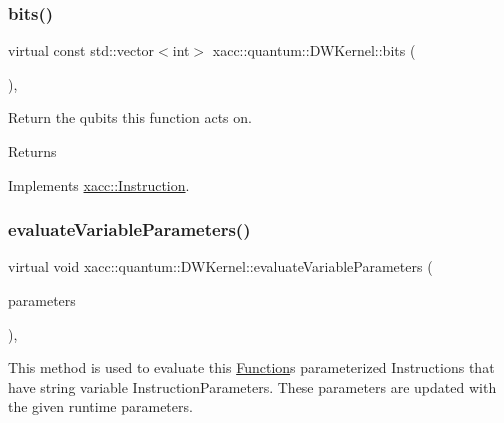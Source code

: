 \mbox{\label{a01221_adae68964db6acd8b4c2267c270a8ec58}} 
\subsubsection{\texorpdfstring{bits()}{bits()}}
{\footnotesize\ttfamily virtual const std\+::vector$<$int$>$ xacc\+::quantum\+::\+D\+W\+Kernel\+::bits (\begin{DoxyParamCaption}{ }\end{DoxyParamCaption})\hspace{0.3cm}{\ttfamily [inline]}, {\ttfamily [virtual]}}

Return the qubits this function acts on. \begin{DoxyReturn}{Returns}

\end{DoxyReturn}


Implements \hyperlink{a01657_a819f32e94c3e1c9e69a0061aaf8d86dc}{xacc\+::\+Instruction}.

\mbox{\label{a01221_a09ffac417d4ecbbd82d7a680ad8dfcce}} 
\subsubsection{\texorpdfstring{evaluate\+Variable\+Parameters()}{evaluateVariableParameters()}}
{\footnotesize\ttfamily virtual void xacc\+::quantum\+::\+D\+W\+Kernel\+::evaluate\+Variable\+Parameters (\begin{DoxyParamCaption}\item[{std\+::vector$<$ Instruction\+Parameter $>$}]{parameters }\end{DoxyParamCaption})\hspace{0.3cm}{\ttfamily [inline]}, {\ttfamily [virtual]}}

This method is used to evaluate this \hyperlink{a01653}{Function}\textquotesingle{}s parameterized Instructions that have string variable Instruction\+Parameters. These parameters are updated with the given runtime parameters.


